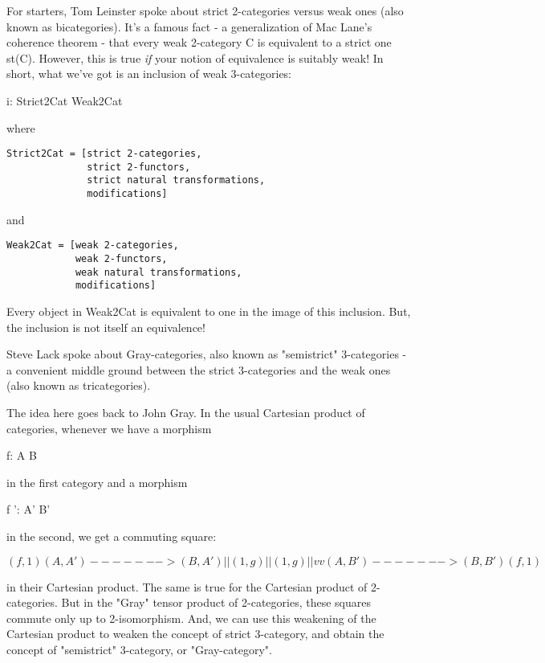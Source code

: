 For starters, Tom Leinster spoke about strict 2-categories versus weak
ones (also known as bicategories).  It's a famous fact - a
generalization of Mac Lane's coherence theorem - that every weak
2-category C is equivalent to a strict one st(C).  However, this is
true \emph{if} your notion of equivalence is suitably weak!  In
short, what we've got is an inclusion of weak 3-categories:

i: Strict2Cat \to  Weak2Cat

where 

\begin{verbatim}
Strict2Cat = [strict 2-categories, 
              strict 2-functors, 
              strict natural transformations,
              modifications]
\end{verbatim}
    
and 

\begin{verbatim}
Weak2Cat = [weak 2-categories,
            weak 2-functors,
            weak natural transformations,
            modifications]
\end{verbatim}
    
Every object in Weak2Cat is equivalent to one in the image of
this inclusion.  But, the inclusion is not itself an equivalence!

Steve Lack spoke about Gray-categories, also known as
"semistrict" 3-categories - a convenient middle ground
between the strict 3-categories and the weak ones (also known as
tricategories).

The idea here goes back to John Gray.  In the usual Cartesian 
product of categories, whenever we have a morphism

f: A \to  B

in the first category and a morphism

f ': A' \to  B'

in the second, we get a commuting square:
           
$$
           (f,1)
   (A,A') -------> (B,A')
     |               |
(1,g)|               |(1,g)
     |               |
     v               v
   (A,B') -------> (B,B')
           (f,1)
$$
    

in their Cartesian product.  The same is true for the Cartesian
product of 2-categories.  But in the "Gray" tensor product
of 2-categories, these squares commute only up to 2-isomorphism.  And,
we can use this weakening of the Cartesian product to weaken the
concept of strict 3-category, and obtain the concept of
"semistrict" 3-category, or "Gray-category".

